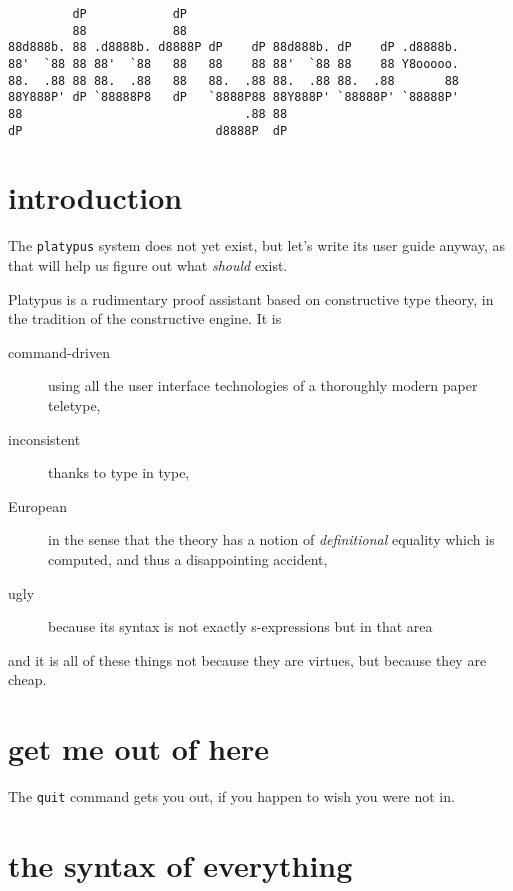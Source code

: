 \documentclass{article}
\begin{document}
\begin{verbatim}
         dP            dP                                       
         88            88                                       
88d888b. 88 .d8888b. d8888P dP    dP 88d888b. dP    dP .d8888b. 
88'  `88 88 88'  `88   88   88    88 88'  `88 88    88 Y8ooooo. 
88.  .88 88 88.  .88   88   88.  .88 88.  .88 88.  .88       88 
88Y888P' dP `88888P8   dP   `8888P88 88Y888P' `88888P' `88888P' 
88                               .88 88                         
dP                           d8888P  dP                         
\end{verbatim}


\vspace*{1in}

\section{introduction}

The {\tt platypus} system does not yet exist, but let's write its user guide anyway,
as that will help us figure out what \emph{should} exist.

Platypus is a rudimentary proof assistant based on constructive type theory, in the
tradition of the constructive engine. It is
\begin{description}
\item[command-driven] using all the user interface technologies of a thoroughly
  modern paper teletype,
\item[inconsistent] thanks to type in type,
\item[European] in the sense that the theory has a notion of \emph{definitional}
  equality which is computed, and thus a disappointing accident,
\item[ugly] because its syntax is not exactly s-expressions but in that area
\end{description}
and it is all of these things not because they are virtues, but because they are
cheap.


\section{get me out of here}

The {\tt quit} command gets you out, if you happen to wish you were
not in.

\section{the syntax of everything}
\end{document}
